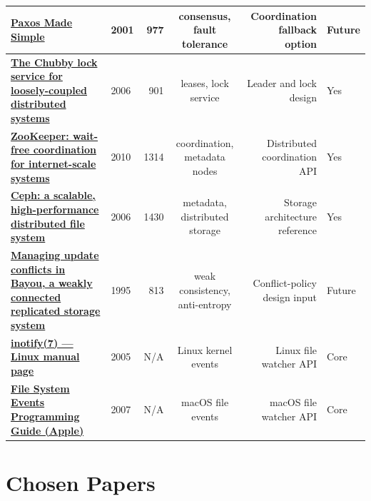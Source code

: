 \documentclass[11pt,oneside]{article}
\begin{document}
\begin{longtable}{|L|Y|N|C|D|K|}
\href{https://lamport.azurewebsites.net/pubs/paxos-simple.pdf}{\textbf{Paxos Made Simple}} & 2001 & 977 &
consensus, fault tolerance & Coordination fallback option & Future \\
\hline

\href{https://dl.acm.org/doi/10.5555/1298455.1298487}{\textbf{The Chubby lock service for loosely-coupled distributed systems}} & 2006 & 901 &
leases, lock service & Leader and lock design & Yes \\
\hline

\href{https://www.usenix.org/legacy/event/atc10/tech/full_papers/Hunt.pdf}{\textbf{ZooKeeper: wait-free coordination for internet-scale systems}} & 2010 & 1314 &
coordination, metadata nodes & Distributed coordination API & Yes \\
\hline

\href{https://www.usenix.org/legacy/event/osdi06/tech/full_papers/weil/weil.pdf}{\textbf{Ceph: a scalable, high-performance distributed file system}} & 2006 & 1430 &
metadata, distributed storage & Storage architecture reference & Yes \\
\hline

\href{https://doi.org/10.1145/224056.224070}{\textbf{Managing update conflicts in Bayou, a weakly connected replicated storage system}} & 1995 & 813 &
weak consistency, anti-entropy & Conflict-policy design input & Future \\
\hline

\href{https://man7.org/linux/man-pages/man7/inotify.7.html}{\textbf{inotify(7) --- Linux manual page}} & 2005 & N/A &
Linux kernel events & Linux file watcher API & Core \\
\hline

\href{https://developer.apple.com/library/archive/documentation/Darwin/Conceptual/FSEvents_ProgGuide/Introduction/Introduction.html}{\textbf{File System Events Programming Guide (Apple)}} & 2007 & N/A &
macOS file events & macOS file watcher API & Core \\
\hline

\end{longtable}

\clearpage

\section{Chosen Papers}
\end{document}
